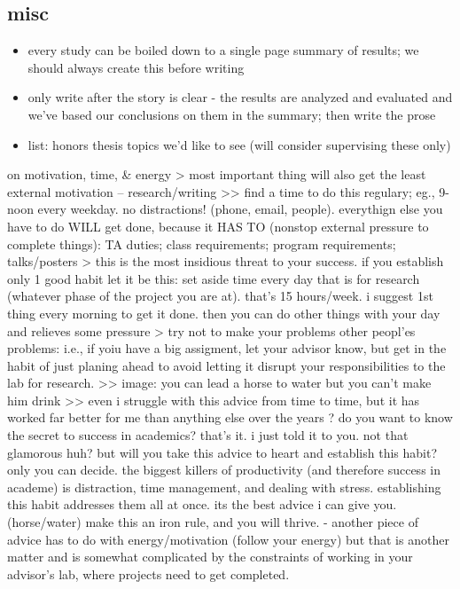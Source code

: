 \documentclass[
]{book}
\begin{document}
\hypertarget{misc}{%
\subsection{misc}\label{misc}}

\begin{itemize}
\item
  every study can be boiled down to a single page summary of results; we should always create this before writing
\item
  only write after the story is clear - the results are analyzed and evaluated and we've based our conclusions on them in the summary; then write the prose
\item
  list: honors thesis topics we'd like to see (will consider supervising these only)
\end{itemize}

on motivation, time, \& energy
\textgreater{} most important thing will also get the least external motivation -- research/writing
\textgreater\textgreater{} find a time to do this regulary; eg., 9-noon every weekday. no distractions! (phone, email, people).
everythign else you have to do WILL get done, because it HAS TO (nonstop external pressure to complete things): TA duties; class requirements; program requirements; talks/posters
\textgreater{} this is the most insidious threat to your success. if you establish only 1 good habit let it be this: set aside time every day that is for research (whatever phase of the project you are at). that's 15 hours/week. i suggest 1st thing every morning to get it done. then you can do other things with your day and relieves some pressure
\textgreater{} try not to make your problems other peopl'es problems: i.e., if yoiu have a big assigment, let your advisor know, but get in the habit of just planing ahead to avoid letting it disrupt your responsibilities to the lab for research.
\textgreater\textgreater{} image: you can lead a horse to water but you can't make him drink
\textgreater\textgreater{} even i struggle with this advice from time to time, but it has worked far better for me than anything else over the years
? do you want to know the secret to success in academics? that's it. i just told it to you. not that glamorous huh? but will you take this advice to heart and establish this habit? only you can decide. the biggest killers of productivity (and therefore success in academe) is distraction, time management, and dealing with stress. establishing this habit addresses them all at once. its the best advice i can give you. (horse/water) make this an iron rule, and you will thrive.
- another piece of advice has to do with energy/motivation (follow your energy) but that is another matter and is somewhat complicated by the constraints of working in your advisor's lab, where projects need to get completed.
\end{document}
